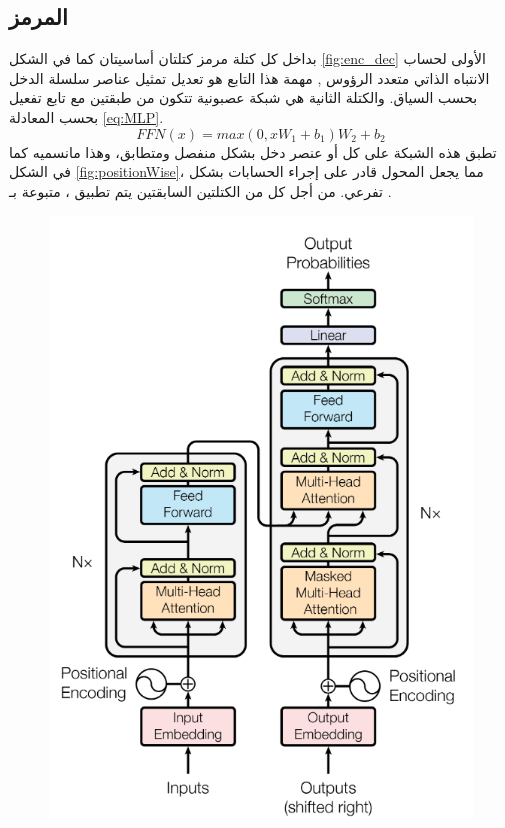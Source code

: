 \subsection{المرمز}
بداخل كل كتلة مرمز كتلتان أساسيتان كما في الشكل
\ref{fig:enc_dec}
 الأولى لحساب الانتباه الذاتي متعدد الرؤوس 
,
مهمة هذا التابع هو تعديل تمثيل عناصر سلسلة الدخل بحسب السياق.
والكتلة الثانية هي شبكة عصبونية
تتكون من طبقتين مع تابع تفعيل 
بحسب المعادلة
\ref{eq:MLP}.
\begin{equation}
FFN(x) = max(0,xW_1+b_1)W_2+b_2
\label{eq:MLP}
\end{equation}
تطبق هذه الشبكة على كل
أو عنصر دخل بشكل منفصل ومتطابق، وهذا مانسميه
كما في الشكل
\ref{fig:positionWise}،
مما يجعل المحول قادر على إجراء الحسابات بشكل تفرعي.
من أجل كل من الكتلتين السابقتين يتم تطبيق
،
 متبوعة بـ
.
\newline
\begin{figure}[H]
	\centerline{\includegraphics[scale=0.5]{images/Transformer}}
	\caption{
	}
	\label{fig:Transformer}
\end{figure}

